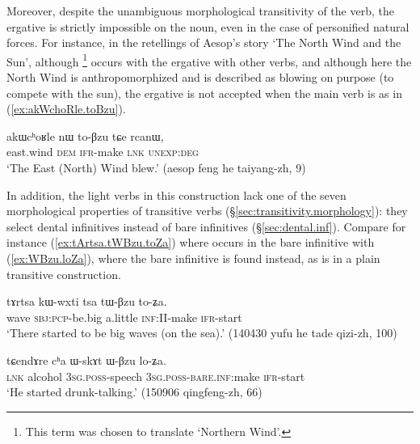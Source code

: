 Moreover, despite the unambiguous morphological transitivity of the verb, the ergative is strictly impossible on the noun,  even in the case of personified natural forces. For instance, in the retellings of Aesop's story `The North Wind and the Sun', although  \footnote{This term was chosen to translate `Northern Wind'.} occurs with the ergative with other verbs, and although here the North Wind is anthropomorphized and is described as blowing on purpose (to compete with the sun), the ergative is not accepted when the main verb is  as in (\ref{ex:akWchoRle.toBzu}).

\begin{exe}
\ex \label{ex:akWchoRle.toBzu}
\gll akɯcʰoʁle nɯ to-βzu tɕe rcanɯ, \\
east.wind \textsc{dem} \textsc{ifr}-make \textsc{lnk} \textsc{unexp}:\textsc{deg} \\
\glt `The East (North) Wind blew.' (aesop feng he taiyang-zh, 9)
\end{exe}

In addition, the light verbs in this construction lack one of the seven morphological properties of transitive verbs (§\ref{sec:transitivity.morphology}): they select dental infinitives instead of bare infinitives (§\ref{sec:dental.inf}). Compare for instance (\ref{ex:tArtsa.tWBzu.toZa}) where  occurs in the bare infinitive  with (\ref{ex:WBzu.loZa}), where the bare infinitive  is found instead, as  is in a plain transitive construction.

\begin{exe}
\ex \label{ex:tArtsa.tWBzu.toZa}
\gll tɤrtsa kɯ-wxti tsa tɯ-βzu to-ʑa. \\
wave \textsc{sbj}:\textsc{pcp}-be.big a.little \textsc{inf}:II-make \textsc{ifr}-start \\
\glt `There started to be big waves (on the sea).' (140430 yufu he tade qizi-zh, 100)
\end{exe}

\begin{exe}
\ex \label{ex:WBzu.loZa}
\gll tɕendɤre cʰa ɯ-skɤt ɯ-βzu lo-ʑa.  \\
\textsc{lnk} alcohol \textsc{3sg}.\textsc{poss}-speech \textsc{3sg}.\textsc{poss}-\textsc{bare}.\textsc{inf}:make \textsc{ifr}-start \\
\glt `He started drunk-talking.' (150906 qingfeng-zh, 66)
\end{exe}

